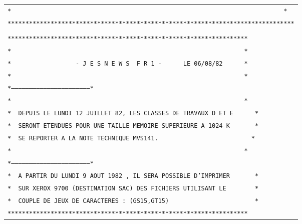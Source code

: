 \begin{tabular}{@{}l@{}}
\texttt{*\ \ \ \ \ \ \ \ \ \ \ \ \ \ \ \ \ \ \ \ \ \ \ \ \ \ \ \ \ \ \ \ \ \ \ \ \ \ \ \ \ \ \ \ \ \ \ \ \ \ \ \ \ \ \ \ \ \ \ \ \ \ \ \ \ \ \ \ \ \ \ \ \ \ \ \ *}\\
\texttt{********************************************************************************}\\
\\
\texttt{*******************************************************************}\\
\texttt{*\ \ \ \ \ \ \ \ \ \ \ \ \ \ \ \ \ \ \ \ \ \ \ \ \ \ \ \ \ \ \ \ \ \ \ \ \ \ \ \ \ \ \ \ \ \ \ \ \ \ \ \ \ \ \ \ \ \ \ \ \ \ \ \ \ *}\\
\texttt{*\ \ \ \ \ \ \ \ \ \ \ \ \ \ \ \ \ \ -\ J\ E\ S\ N\ E\ W\ S\ \ F\ R\ 1\ -\ \ \ \ \ \ LE\ 06/08/82\ \ \ \ \ \ *}\\
\texttt{*\ \ \ \ \ \ \ \ \ \ \ \ \ \ \ \ \ \ \ \ \ \ \ \ \ \ \ \ \ \ \ \ \ \ \ \ \ \ \ \ \ \ \ \ \ \ \ \ \ \ \ \ \ \ \ \ \ \ \ \ \ \ \ \ \ *}\\
\texttt{*-----------------------------------------------------------------*}\\
\texttt{*\ \ \ \ \ \ \ \ \ \ \ \ \ \ \ \ \ \ \ \ \ \ \ \ \ \ \ \ \ \ \ \ \ \ \ \ \ \ \ \ \ \ \ \ \ \ \ \ \ \ \ \ \ \ \ \ \ \ \ \ \ \ \ \ \ *}\\
\texttt{*\ \ DEPUIS\ LE\ LUNDI\ 12\ JUILLET\ 82,\ LES\ CLASSES\ DE\ TRAVAUX\ D\ ET\ E\ \ \ \ \ \ *}\\
\texttt{*\ \ SERONT\ ETENDUES\ POUR\ UNE\ TAILLE\ MEMOIRE\ SUPERIEURE\ A\ 1024\ K\ \ \ \ \ \ \ *}\\
\texttt{*\ \ SE\ REPORTER\ A\ LA\ NOTE\ TECHNIQUE\ MVS141.\ \ \ \ \ \ \ \ \ \ \ \ \ \ \ \ \ \ \ \ \ \ \ \ \ \ *}\\
\texttt{*\ \ \ \ \ \ \ \ \ \ \ \ \ \ \ \ \ \ \ \ \ \ \ \ \ \ \ \ \ \ \ \ \ \ \ \ \ \ \ \ \ \ \ \ \ \ \ \ \ \ \ \ \ \ \ \ \ \ \ \ \ \ \ \ \ *}\\
\texttt{*-----------------------------------------------------------------*}\\
\texttt{*\ \ A\ PARTIR\ DU\ LUNDI\ 9\ AOUT\ 1982\ ,\ IL\ SERA\ POSSIBLE\ D'IMPRIMER\ \ \ \ \ \ \ *}\\
\texttt{*\ \ SUR\ XEROX\ 9700\ (DESTINATION\ SAC)\ DES\ FICHIERS\ UTILISANT\ LE\ \ \ \ \ \ \ \ *}\\
\texttt{*\ \ COUPLE\ DE\ JEUX\ DE\ CARACTERES\ :\ (GS15,GT15)\ \ \ \ \ \ \ \ \ \ \ \ \ \ \ \ \ \ \ \ \ \ \ \ *}\\
\texttt{*******************************************************************}\\
\end{tabular}

